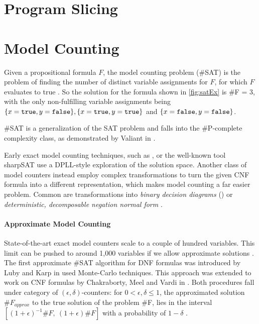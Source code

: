 \section{Program Slicing}

\section{Model Counting}

Given a propositional formula $F$, the model counting problem (\#SAT) is the problem of finding the number of distinct variable assignments for $F$, for which $F$ evaluates to true \cite{biere09}. So the solution for the formula shown in  \ref{fig:satEx} is \#F = 3, with the only non-fulfilling variable assignments being $\{ x = \mathtt{true}, y = \mathtt{false}\}, \{x = \mathtt{true}, y = \mathtt{true}\}$ and  $\{x = \mathtt{false}, y = \mathtt{false}\}$.

\#SAT is a generalization of the SAT problem and falls into the \#P-complete complexity class, as demonstrated by Valiant in \cite{valiant79}.

Early exact model counting techniques, such as \cite{birnbaum99}, or the well-known tool sharpSAT \cite{thurley06} use a DPLL-style exploration of the solution space. Another class of model counters instead employ complex transformations to turn the given CNF formula into a different representation, which makes model counting a far easier problem. Common are transformations into \emph{binary decision diagrams} () or \emph{deterministic, decomposable negation normal form} \cite{darwiche04}.

\paragraph*{Approximate Model Counting}
State-of-the-art exact model counters scale to a couple of hundred variables.  This limit can be pushed to around 1,000 variables if we allow approximate solutions \cite{biere09}.
The first approximate \#SAT algorithm for DNF formulas was introduced by Luby and Karp in \cite{karp89} used Monte-Carlo techniques. This approach was extended to work on CNF formulas by Chakraborty, Meel and Vardi in \cite{chakraborty13}. Both procedures fall under category of $(\epsilon, \delta)$-counters: for $0 < \epsilon, \delta \leq 1$, the approximated solution $\#F_{approx}$ to the true solution of the problem \#F, lies in the interval $[(1 + \epsilon)^{-1} \#F, \: (1 + \epsilon) \#F]$ with a probability of $1 - \delta$ \cite{karp89,chakraborty13}.

